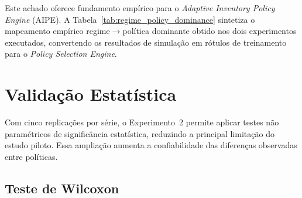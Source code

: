 Este achado oferece fundamento empírico para o \textit{Adaptive Inventory Policy Engine} (AIPE). A Tabela~\ref{tab:regime_policy_dominance} sintetiza o mapeamento empírico regime$\rightarrow$política dominante obtido nos dois experimentos executados, convertendo os resultados de simulação em rótulos de treinamento para o \textit{Policy Selection Engine}.

\begin{table}[ht]
\centering
\small
\caption{Mapeamento empírico de dominância regime$\rightarrow$política (CTI puro sob NS $\geq 0.70$). ``Dominante'' é a política com menor CTI entre aquelas que atingem NS $\geq 0.70$ no estrato. Fonte: análise estratificada dos dois experimentos executados.}
\label{tab:regime_policy_dominance}
\end{table}

\section{Validação Estatística}
\label{sec:stats}

Com cinco replicações por série, o Experimento~2 permite aplicar testes não paramétricos de significância estatística, reduzindo a principal limitação do estudo piloto. Essa ampliação aumenta a confiabilidade das diferenças observadas entre políticas.

\subsection{Teste de Wilcoxon}

